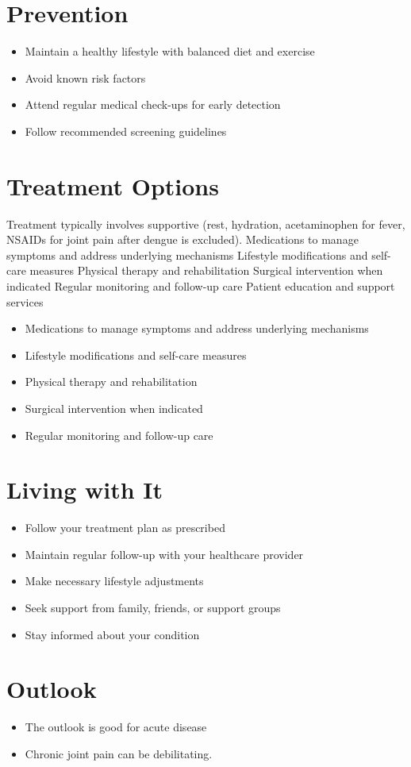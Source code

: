 \section{Prevention}
\begin{itemize}[noitemsep]
  \item Maintain a healthy lifestyle with balanced diet and exercise
  \item Avoid known risk factors
  \item Attend regular medical check-ups for early detection
  \item Follow recommended screening guidelines
\end{itemize}
\section{Treatment Options}
Treatment typically involves supportive (rest, hydration, acetaminophen for fever, NSAIDs for joint pain after dengue is excluded). Medications to manage symptoms and address underlying mechanisms Lifestyle modifications and self-care measures Physical therapy and rehabilitation Surgical intervention when indicated Regular monitoring and follow-up care Patient education and support services

\begin{itemize}[noitemsep]
  \item Medications to manage symptoms and address underlying mechanisms
  \item Lifestyle modifications and self-care measures
  \item Physical therapy and rehabilitation
  \item Surgical intervention when indicated
  \item Regular monitoring and follow-up care
\end{itemize}
\section{Living with It}
\begin{itemize}[noitemsep]
  \item Follow your treatment plan as prescribed
  \item Maintain regular follow-up with your healthcare provider
  \item Make necessary lifestyle adjustments
  \item Seek support from family, friends, or support groups
  \item Stay informed about your condition
\end{itemize}
\section{Outlook}
\begin{itemize}[noitemsep]
  \item The outlook is good for acute disease
  \item Chronic joint pain can be debilitating.
\end{itemize}
